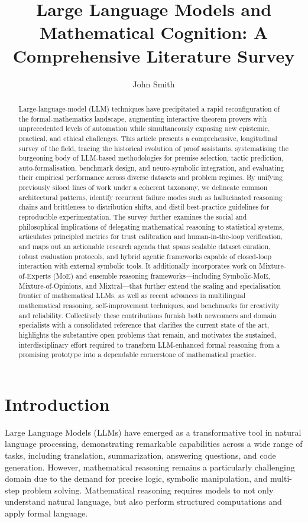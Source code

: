 \documentclass[acmsmall,anonymous]{acmart}
\title{Large Language Models and Mathematical Cognition: A Comprehensive Literature Survey}
\author{John Smith}
\affiliation{%
  \institution{The Th{\o}rv{\"a}ld Group}
  \city{Hekla}
  \country{Iceland}}
\begin{document}
\begin{abstract}
Large-language-model (LLM) techniques have precipitated a rapid reconfiguration of the formal-mathematics landscape, augmenting interactive theorem provers with unprecedented levels of automation while simultaneously exposing new epistemic, practical, and ethical challenges. This article presents a comprehensive, longitudinal survey of the field, tracing the historical evolution of proof assistants, systematising the burgeoning body of LLM-based methodologies for premise selection, tactic prediction, auto-formalisation, benchmark design, and neuro-symbolic integration, and evaluating their empirical performance across diverse datasets and problem regimes. By unifying previously siloed lines of work under a coherent taxonomy, we delineate common architectural patterns, identify recurrent failure modes such as hallucinated reasoning chains and brittleness to distribution shifts, and distil best-practice guidelines for reproducible experimentation. The survey further examines the social and philosophical implications of delegating mathematical reasoning to statistical systems, articulates principled metrics for trust calibration and human-in-the-loop verification, and maps out an actionable research agenda that spans scalable dataset curation, robust evaluation protocols, and hybrid agentic frameworks capable of closed-loop interaction with external symbolic tools. It additionally incorporates work on Mixture-of-Experts (MoE) and ensemble reasoning frameworks—including Symbolic-MoE, Mixture-of-Opinions, and Mixtral—that further extend the scaling and specialisation frontier of mathematical LLMs, as well as recent advances in multilingual mathematical reasoning, self-improvement techniques, and benchmarks for creativity and reliability. Collectively these contributions furnish both newcomers and domain specialists with a consolidated reference that clarifies the current state of the art, highlights the substantive open problems that remain, and motivates the sustained, interdisciplinary effort required to transform LLM-enhanced formal reasoning from a promising prototype into a dependable cornerstone of mathematical practice.
\end{abstract}


\maketitle

\section{Introduction}
Large Language Models (LLMs) have emerged as a transformative tool in natural language processing, demonstrating remarkable capabilities across a wide range of tasks, including translation, summarization, answering questions, and code generation. However, mathematical reasoning remains a particularly challenging domain due to the demand for precise logic, symbolic manipulation, and multi-step problem solving. Mathematical reasoning requires models to not only understand natural language, but also perform structured computations and apply formal language. 
\end{document}
